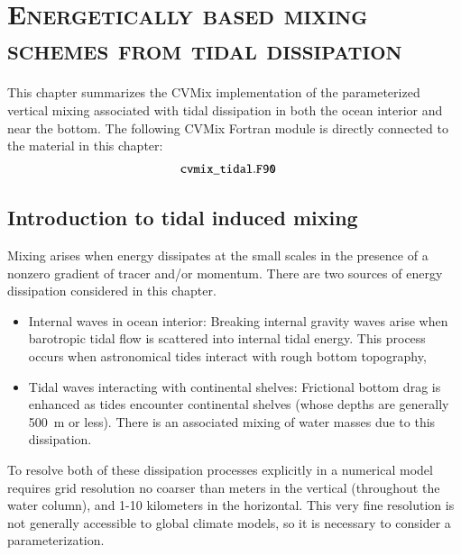 \chapter{\scshape Energetically based mixing schemes from tidal dissipation}
\label{chapter:cvmix_tidal}

\minitoc
\vspace{.5cm}

\begin{mdframed}[backgroundcolor=lightgray!50]
This chapter summarizes the CVMix implementation of the parameterized
vertical mixing associated with tidal dissipation in both the ocean
interior and near the bottom.  The following CVMix Fortran module is
directly connected to the material in this chapter:
\begin{align*} 
 &{\tt cvmix\_tidal.F90}
\end{align*}
\end{mdframed}

\section{Introduction to tidal induced mixing}
\label{section:vert_tidal_intro}

Mixing arises when energy dissipates at the small scales in the
presence of a nonzero gradient of tracer and/or momentum.  There are
two sources of energy dissipation considered in this chapter.
\begin{itemize}

\item {\sc Internal waves in ocean interior}: Breaking internal
  gravity waves arise when barotropic tidal flow is scattered into
  internal tidal energy. This process occurs when astronomical tides
  interact with rough bottom topography,

\item {\sc Tidal waves interacting with continental shelves}:
  Frictional bottom drag is enhanced as tides encounter continental
  shelves (whose depths are generally 500~m or less).  There is an
  associated mixing of water masses due to this dissipation.

\end{itemize}
To resolve both of these dissipation processes explicitly in a
numerical model requires grid resolution no coarser than meters in the
vertical (throughout the water column), and 1-10 kilometers in the
horizontal.  This very fine resolution is not generally accessible to
global climate models, so it is necessary to consider a
parameterization.

